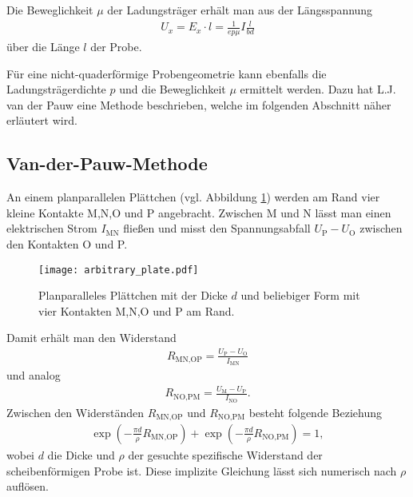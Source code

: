 \newpage
Die Beweglichkeit $\mu$ der Ladungsträger erhält man aus der Längsspannung
\begin{align}
U_x=E_x\cdot l=\frac{1}{ep\mu}I\frac{l}{bd}
\end{align}
über die Länge $l$ der Probe.

Für eine nicht-quaderförmige Probengeometrie kann ebenfalls die Ladungsträgerdichte $p$ und die Beweglichkeit $\mu$ ermittelt werden. Dazu hat L.J. van der Pauw eine Methode beschrieben, welche im folgenden Abschnitt näher erläutert wird.
\subsection{Van-der-Pauw-Methode}
An einem planparallelen Plättchen (vgl. Abbildung \ref{fig:vdP}) werden am Rand vier kleine Kontakte M,N,O und P angebracht. Zwischen M und N lässt man einen elektrischen Strom $I_\text{MN}$ fließen und misst den Spannungsabfall $U_\text{P}-U_\text{O}$ zwischen den Kontakten O und P.
\begin{figure}[h]
\centering
\texttt{[image: arbitrary\_plate.pdf]}
\caption{Planparalleles Plättchen mit der Dicke $d$ und beliebiger Form mit vier Kontakten M,N,O und P am Rand.}
\label{fig:vdP}
\end{figure}

 Damit erhält man den Widerstand
\begin{align}
R_\text{MN,OP}=\frac{U_\text{P}-U_\text{O}}{I_\text{MN}}
\end{align}
und analog
\begin{align}
R_\text{NO,PM}=\frac{U_\text{M}-U_\text{P}}{I_\text{NO}}.
\end{align}
Zwischen den Widerständen $R_\text{MN,OP}$ und $R_\text{NO,PM}$ besteht folgende Beziehung
\begin{align}
\exp\left(-\frac{\pi d}{\rho}R_\text{MN,OP}\right)+\exp\left(-\frac{\pi d}{\rho}R_\text{NO,PM}\right)=1,
\end{align}
wobei $d$ die Dicke und $\rho$ der gesuchte spezifische Widerstand der scheibenförmigen Probe ist. Diese implizite Gleichung lässt sich numerisch nach $\rho$ auflösen.

